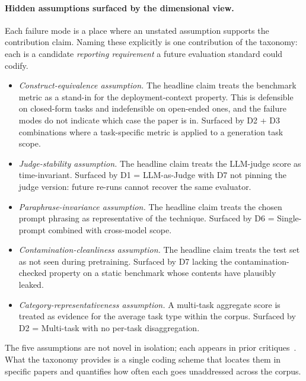 \documentclass[acmsmall, nonacm, screen]{acmart}
\begin{document}
\paragraph{Hidden assumptions surfaced by the dimensional view.}
Each failure mode is a place where an unstated assumption supports the
contribution claim. Naming these explicitly is one contribution of the
taxonomy: each is a candidate \emph{reporting requirement} a future
evaluation standard could codify.

\begin{itemize}
\item \textit{Construct-equivalence assumption.} The headline claim
treats the benchmark metric as a stand-in for the deployment-context
property. This is defensible on closed-form tasks and
indefensible on open-ended ones, and the failure modes do not
indicate which case the paper is in. Surfaced by D2 + D3
combinations where a task-specific metric is applied to a
generation task scope.

\item \textit{Judge-stability assumption.} The headline claim
treats the LLM-judge score as time-invariant. Surfaced by D1 =
LLM-as-Judge with D7 not pinning the judge version: future
re-runs cannot recover the same evaluator.

\item \textit{Paraphrase-invariance assumption.} The headline
claim treats the chosen prompt phrasing as representative of the
technique. Surfaced by D6 = Single-prompt combined with cross-model
scope.

\item \textit{Contamination-cleanliness assumption.} The headline
claim treats the test set as not seen during pretraining. Surfaced
by D7 lacking the contamination-checked property on a static
benchmark whose contents have plausibly leaked.

\item \textit{Category-representativeness assumption.} A
multi-task aggregate score is treated as evidence for the average
task type within the corpus. Surfaced by D2 = Multi-task with no
per-task disaggregation.
\end{itemize}

The five assumptions are not novel in isolation; each appears in
prior critiques~\cite{ni2025benchmarks, sclar2023formatting,
feng2025sage, mizrahi2024state}. What the taxonomy provides is a
single coding scheme that locates them in specific papers and
quantifies how often each goes unaddressed across the corpus.
\end{document}
